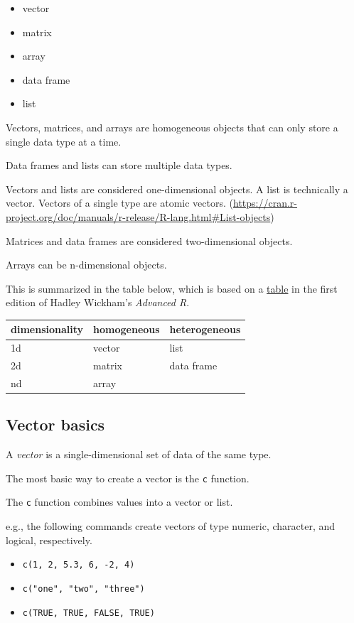 \documentclass[
]{article}
\providecommand{\tightlist}{%
  \setlength{\itemsep}{0pt}\setlength{\parskip}{0pt}}
\begin{document}
\begin{itemize}
\tightlist
\item
  vector
\item
  matrix
\item
  array
\item
  data frame
\item
  list
\end{itemize}

Vectors, matrices, and arrays are homogeneous objects that can only
store a single data type at a time.

Data frames and lists can store multiple data types.

Vectors and lists are considered one-dimensional objects. A list is
technically a vector. Vectors of a single type are atomic vectors.
(\url{https://cran.r-project.org/doc/manuals/r-release/R-lang.html\#List-objects})

Matrices and data frames are considered two-dimensional objects.

Arrays can be n-dimensional objects.

This is summarized in the table below, which is based on a
\href{http://adv-r.had.co.nz/Data-structures.html\#data-structure}{table}
in the first edition of Hadley Wickham's \emph{Advanced R}.

\begin{longtable}[]{@{}lll@{}}
\toprule
dimensionality & homogeneous & heterogeneous\tabularnewline
\midrule
\endhead
1d & vector & list\tabularnewline
2d & matrix & data frame\tabularnewline
nd & array &\tabularnewline
\bottomrule
\end{longtable}

\hypertarget{vector-basics}{%
\subsection{Vector basics}\label{vector-basics}}

A \emph{vector} is a single-dimensional set of data of the same type.

The most basic way to create a vector is the \texttt{c} function.

The \texttt{c} function combines values into a vector or list.

e.g., the following commands create vectors of type numeric, character,
and logical, respectively.

\begin{itemize}
\tightlist
\item
  \texttt{c(1,\ 2,\ 5.3,\ 6,\ -2,\ 4)}
\item
  \texttt{c("one",\ "two",\ "three")}
\item
  \texttt{c(TRUE,\ TRUE,\ FALSE,\ TRUE)}
\end{itemize}
\end{document}
